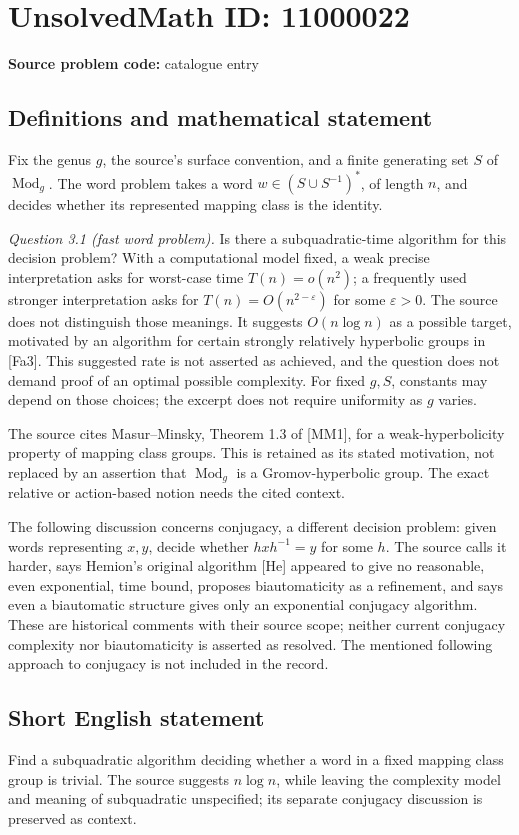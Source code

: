 \documentclass[11pt]{article}
\newcommand{\eps}{\varepsilon}
\begin{document}
\section*{UnsolvedMath ID: 11000022}
\textbf{Source problem code:} catalogue entry
\subsection{Definitions and mathematical statement}
Fix the genus \(g\), the source's surface convention, and a finite generating set \(S\) of \(\operatorname{Mod}_g\). The word problem takes a word \(w\in(S\cup S^{-1})^*\), of length \(n\), and decides whether its represented mapping class is the identity.

\emph{Question 3.1 (fast word problem).} Is there a subquadratic-time algorithm for this decision problem? With a computational model fixed, a weak precise interpretation asks for worst-case time \(T(n)=o(n^2)\); a frequently used stronger interpretation asks for \(T(n)=O(n^{2-\eps})\) for some \(\eps>0\). The source does not distinguish those meanings. It suggests \(O(n\log n)\) as a possible target, motivated by an algorithm for certain strongly relatively hyperbolic groups in [Fa3]. This suggested rate is not asserted as achieved, and the question does not demand proof of an optimal possible complexity. For fixed \(g,S\), constants may depend on those choices; the excerpt does not require uniformity as \(g\) varies.

The source cites Masur--Minsky, Theorem 1.3 of [MM1], for a weak-hyperbolicity property of mapping class groups. This is retained as its stated motivation, not replaced by an assertion that \(\operatorname{Mod}_g\) is a Gromov-hyperbolic group. The exact relative or action-based notion needs the cited context.

The following discussion concerns conjugacy, a different decision problem: given words representing \(x,y\), decide whether \(hxh^{-1}=y\) for some \(h\). The source calls it harder, says Hemion's original algorithm [He] appeared to give no reasonable, even exponential, time bound, proposes biautomaticity as a refinement, and says even a biautomatic structure gives only an exponential conjugacy algorithm. These are historical comments with their source scope; neither current conjugacy complexity nor biautomaticity is asserted as resolved. The mentioned following approach to conjugacy is not included in the record.
\subsection{Short English statement}
Find a subquadratic algorithm deciding whether a word in a fixed mapping class group is trivial. The source suggests \(n\log n\), while leaving the complexity model and meaning of subquadratic unspecified; its separate conjugacy discussion is preserved as context.
\end{document}
